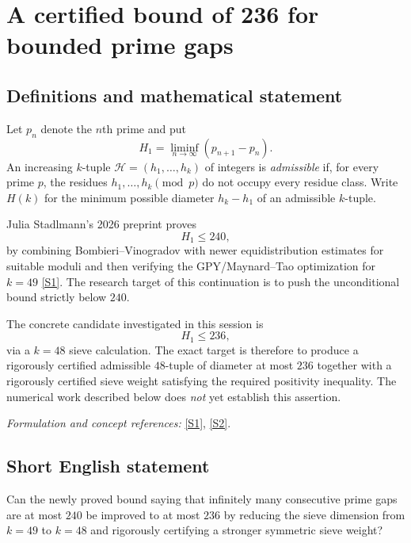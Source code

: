 \documentclass[11pt]{article}
\begin{document}
\section*{\texorpdfstring{A certified bound of 236 for bounded prime gaps}{A certified bound of 236 for bounded prime gaps}}\label{prime-gaps-below-240}\label{30006973}

\subsection{Definitions and mathematical statement}
Let $p_n$ denote the $n$th prime and put
\[
 H_1=\liminf_{n\to\infty}(p_{n+1}-p_n).
\]
An increasing $k$-tuple $\mathcal H=(h_1,\ldots,h_k)$ of integers is \emph{admissible} if, for every prime $p$, the residues $h_1,\ldots,h_k\pmod p$ do not occupy every residue class.  Write $H(k)$ for the minimum possible diameter $h_k-h_1$ of an admissible $k$-tuple.

Julia Stadlmann's 2026 preprint proves
\[
 \boxed{H_1\le 240},
\]
by combining Bombieri--Vinogradov with newer equidistribution estimates for suitable moduli and then verifying the GPY/Maynard--Tao optimization for $k=49$ \href{https://arxiv.org/abs/2608.31126}{[S1]}.  The research target of this continuation is to push the unconditional bound strictly below $240$.

The concrete candidate investigated in this session is
\[
 \boxed{H_1\le 236},
\]
via a $k=48$ sieve calculation.  The exact target is therefore to produce a rigorously certified admissible $48$-tuple of diameter at most $236$ together with a rigorously certified sieve weight satisfying the required positivity inequality.  The numerical work described below does \emph{not} yet establish this assertion.

\par\smallskip\textit{Formulation and concept references:} \href{https://arxiv.org/abs/2608.31126}{[S1]}, \href{https://arxiv.org/abs/1407.4897}{[S2]}.

\subsection{Short English statement}
Can the newly proved bound saying that infinitely many consecutive prime gaps are at most $240$ be improved to at most $236$ by reducing the sieve dimension from $k=49$ to $k=48$ and rigorously certifying a stronger symmetric sieve weight?
\end{document}
